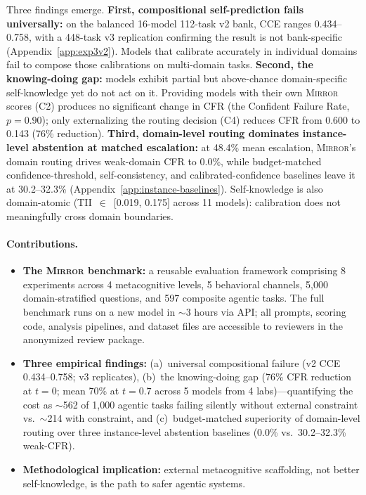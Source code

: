 \documentclass[10pt]{article}
\newcommand{\mirror}{\textsc{Mirror}}
\newcommand{\CCE}{CCE}
\newcommand{\CFR}{CFR}
\newcommand{\TII}{TII}
\begin{document}
Three findings emerge. \textbf{First, compositional self-prediction fails universally:} on the balanced 16-model 112-task v2 bank, \CCE{} ranges 0.434--0.758, with a 448-task v3 replication confirming the result is not bank-specific (Appendix~\ref{app:exp3v2}). Models that calibrate accurately in individual domains fail to compose those calibrations on multi-domain tasks. \textbf{Second, the knowing-doing gap:} models exhibit partial but above-chance domain-specific self-knowledge yet do not act on it. Providing models with their own \mirror{} scores (C2) produces no significant change in \CFR{} (the Confident Failure Rate, $p\!=\!0.90$); only externalizing the routing decision (C4) reduces \CFR{} from 0.600 to 0.143 (76\% reduction). \textbf{Third, domain-level routing dominates instance-level abstention at matched escalation:} at 48.4\% mean escalation, \mirror{}'s domain routing drives weak-domain \CFR{} to 0.0\%, while budget-matched confidence-threshold, self-consistency, and calibrated-confidence baselines leave it at 30.2--32.3\% (Appendix~\ref{app:instance-baselines}). Self-knowledge is also domain-atomic (\TII{}~$\in$~[0.019, 0.175] across 11 models): calibration does not meaningfully cross domain boundaries.

\paragraph{Contributions.}
\begin{itemize}
  \setlength\itemsep{2pt}
  \item \textbf{The \mirror{} benchmark:} a reusable evaluation framework comprising
        8 experiments across 4 metacognitive levels, 5 behavioral channels, 5{,}000
        domain-stratified questions, and 597 composite agentic tasks. The full
        benchmark runs on a new model in $\sim$3 hours via API; all prompts,
        scoring code, analysis pipelines, and dataset files are accessible to
        reviewers in the anonymized review package.
  \item \textbf{Three empirical findings:} (a)~universal compositional failure
        (v2 \CCE{} 0.434--0.758; v3 replicates), (b)~the knowing-doing gap
        (76\% \CFR{} reduction at $t\!=\!0$; mean 70\% at $t\!=\!0.7$ across 5 models from 4 labs)---quantifying the cost as $\sim$562 of 1{,}000 agentic tasks failing silently without external constraint vs.\ $\sim$214 with constraint, and (c)~budget-matched superiority of domain-level routing over three instance-level abstention baselines (0.0\% vs.\ 30.2--32.3\% weak-\CFR{}).
  \item \textbf{Methodological implication:} external metacognitive scaffolding, not better self-knowledge, is the path to safer agentic systems.
\end{itemize}
\end{document}
